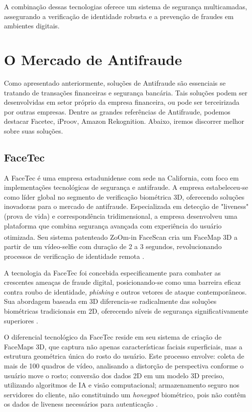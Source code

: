 A combinação dessas tecnologias oferece um sistema de segurança multicamadas, assegurando a verificação de identidade robusta e a prevenção de fraudes em ambientes digitais.

\section{O Mercado de Antifraude}
\label{mercado}
Como apresentado anteriormente, soluções de Antifraude são essenciais se tratando de transações financeiras e segurança bancária. Tais soluções podem ser desenvolvidas em setor próprio da empresa financeira, ou pode ser terceirizada por outras empresas. Dentre as grandes referências de Antifraude, podemos destacar Facetec, iProov, Amazon Rekognition. Abaixo, iremos discorrer melhor sobre suas soluções.

\subsection{FaceTec}
\label{facetec}
A FaceTec é uma empresa estadunidense com sede na California, com foco em implementações tecnológicas de segurança e antifraude. A empresa estabeleceu-se como líder global no segmento de verificação biométrica 3D, oferecendo soluções inovadoras para o mercado de antifraude. Especializada em detecção	 de "liveness" (prova de vida) e correspondência tridimensional, a empresa desenvolveu uma plataforma que combina segurança avançada com experiência do usuário otimizada. Seu sistema patenteado ZoOm-in FaceScan\textsuperscript{\textregistered} cria um FaceMap\textsuperscript{\textregistered} 3D a partir de um vídeo-selfie com duração de 2 a 3 segundos, revolucionando processos de verificação de identidade remota \cite{facetec_2025}.

A tecnologia da FaceTec foi concebida especificamente para combater as crescentes ameaças de fraude digital, posicionando-se como uma barreira eficaz contra roubo de identidade, \textit{phishing} e outros vetores de ataque contemporâneos. Sua abordagem baseada em 3D diferencia-se radicalmente das soluções biométricas tradicionais em 2D, oferecendo níveis de segurança significativamente superiores \cite{facetec_2025}.

O diferencial tecnológico da FaceTec reside em seu sistema de criação de FaceMaps 3D, que captura não apenas características faciais superficiais, mas a estrutura geométrica única do rosto do usuário. Este processo envolve: coleta de mais de 100 quadros de vídeo, analisando a distorção de perspectiva conforme o usuário move o rosto; conversão dos dados 2D em um modelo 3D preciso, utilizando algoritmos de IA e visão computacional; armazenamento seguro nos servidores do cliente, não constituindo um \textit{honeypot} biométrico, pois não contêm os dados de liveness necessários para autenticação \cite{facetec_2025}. 

